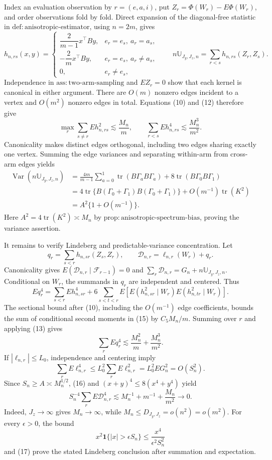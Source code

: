 Index an evaluation observation by \(r=(e,a,i)\), put \(Z_r=\Phi(W_r)-E\Phi(W_r)\), and order observations fold by fold. Direct expansion of the diagonal-free statistic in \(\mathrm{def{:}anisotropic\text{-}estimator}\), using \(n=2m\), gives
\[
h_{n,rs}(x,y)=
\begin{cases}
\dfrac{2}{m-1}x^{\top}By,&e_r=e_s,\ a_r=a_s,\\[4pt]
-\dfrac{2}{m}x^{\top}By,&e_r=e_s,\ a_r\ne a_s,\\[4pt]
0,&e_r\ne e_s,
\end{cases}
\qquad
n\mathbb U_{J_y,J_z,n}=\sum_{r<s}h_{n,rs}(Z_r,Z_s). \tag{12}
\]
Independence in \(\mathrm{ass{:}two\text{-}arm\text{-}sampling}\) and \(EZ_r=0\) show that each kernel is canonical in either argument. There are \(O(m)\) nonzero edges incident to a vertex and \(O(m^2)\) nonzero edges in total. Equations (10) and (12) therefore give
\[
\max_r\sum_{s\ne r}Eh_{n,rs}^2\lesssim\frac{M_n}{m},
\qquad
\sum_{r<s}Eh_{n,rs}^4\lesssim\frac{M_n^3}{m^2}. \tag{13}
\]
Canonicality makes distinct edges orthogonal, including two edges sharing exactly one vertex. Summing the edge variances and separating within-arm from cross-arm edges yields
\[
\begin{split}
\operatorname{Var}(n\mathbb U_{J_y,J_z,n})
&=\frac{4m}{m-1}\sum_{a=0}^1\operatorname{tr}(B\Gamma_aB\Gamma_a)
+8\operatorname{tr}(B\Gamma_0B\Gamma_1)\\
&=4\operatorname{tr}\{B(\Gamma_0+\Gamma_1)B(\Gamma_0+\Gamma_1)\}
+O(m^{-1})\operatorname{tr}(K^2)\\
&=A^2\{1+O(m^{-1})\}.
\end{split} \tag{14}
\]
Here \(A^2=4\operatorname{tr}(K^2)\asymp M_n\) by \(\mathrm{prop{:}anisotropic\text{-}spectrum\text{-}bias}\), proving the variance assertion.

It remains to verify Lindeberg and predictable-variance concentration. Let
\[
q_r=\sum_{s<r}h_{n,sr}(Z_s,Z_r),
\qquad
\mathcal D_{n,r}=\ell_{n,r}(W_r)+q_r.
\]
Canonicality gives \(E(\mathcal D_{n,r}\mid\mathcal F_{r-1})=0\) and \(\sum_r\mathcal D_{n,r}=G_n+n\mathbb U_{J_y,J_z,n}\). Conditional on \(W_r\), the summands in \(q_r\) are independent and centered. Thus
\[
Eq_r^4
=\sum_{s<r}Eh_{n,sr}^4
+6\sum_{s<t<r}E\!\left[E(h_{n,sr}^2\mid W_r)E(h_{n,tr}^2\mid W_r)\right]. \tag{15}
\]
The sectional bound after (10), including the \(O(m^{-1})\) edge coefficients, bounds the sum of conditional second moments in (15) by \(C_5M_n/m\). Summing over \(r\) and applying (13) gives
\[
\sum_rEq_r^4\lesssim\frac{M_n^2}{m}+\frac{M_n^3}{m^2}. \tag{16}
\]
If \(|\ell_{n,r}|\le L_0\), independence and centering imply
\[
\sum_rE\ell_{n,r}^4\le L_0^2\sum_rE\ell_{n,r}^2
=L_0^2EG_n^2=O(S_n^2).
\]
Since \(S_n\ge A\asymp M_n^{1/2}\), (16) and \((x+y)^4\le8(x^4+y^4)\) yield
\[
S_n^{-4}\sum_rE\mathcal D_{n,r}^4
\lesssim M_n^{-1}+m^{-1}+\frac{M_n}{m^2}\longrightarrow0. \tag{17}
\]
Indeed, \(J_z\to\infty\) gives \(M_n\to\infty\), while \(M_n\le D_{J_y,J_z}=o(n^2)=o(m^2)\). For every \(\epsilon>0\), the bound
\[
x^2\mathbf 1\{|x|>\epsilon S_n\}\le\frac{x^4}{\epsilon^2S_n^2}
\]
and (17) prove the stated Lindeberg conclusion after summation and expectation.

